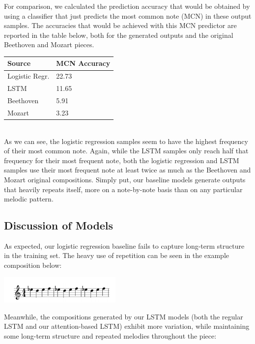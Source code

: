 \documentclass[twoside,twocolumn]{article}
\begin{document}
For comparison, we calculated the prediction accuracy that would be obtained by using a classifier that just predicts the most common note (MCN) in these output samples. The accuracies that would be achieved with this MCN predictor are reported in the table below, both for the generated outputs and the original Beethoven and Mozart pieces. \\

\begin{tabular}{|l|l|}
\hline
\textbf{Source} & \textbf{MCN Accuracy} \\ \hline
Logistic Regr.  & 22.73                 \\ \hline
LSTM            & 11.65                 \\ \hline
Beethoven       & 5.91                  \\ \hline
Mozart          & 3.23                  \\ \hline
\end{tabular} \\

As we can see, the logistic regression samples seem to have the highest frequency of their most common note. Again, while the LSTM samples only reach half that frequency for their most frequent note, both the logistic regression and LSTM samples use their most frequent note at least twice as much as the Beethoven and Mozart original compositions. Simply put, our baseline models generate outputs that heavily repeats itself, more on a note-by-note basis than on any particular melodic pattern.

\subsection{Discussion of Models}

As expected, our logistic regression baseline fails to capture long-term
structure in the training set. The heavy use of repetition can be seen in the example composition below:

\includegraphics[width = 0.45\textwidth]{images/logreg_composition.png}

Meanwhile, the compositions generated by our LSTM models (both the regular LSTM and our attention-based LSTM) exhibit more
variation, while maintaining some long-term structure and repeated
melodies throughout the piece:
\end{document}
